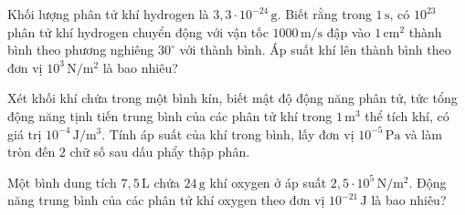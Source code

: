 \begin{ex}
Khối lượng phân tử khí hydrogen là $3,3\cdot 10^{-24}\,\mathrm{g}$. Biết rằng trong $1\,\mathrm{s}$, có $10^{23}$ phân tử khí hydrogen chuyển động với vận tốc $1000\,\mathrm{m/s}$ đập vào $1\,\mathrm{cm^2}$ thành bình theo phương nghiêng $30^\circ$ với thành bình. Áp suất khí lên thành bình theo đơn vị $10^3\,\mathrm{N/m^2}$ là bao nhiêu?
\end{ex}

\begin{ex}
Xét khối khí chứa trong một bình kín, biết mật độ động năng phân tử, tức tổng động năng tịnh tiến trung bình của các phân tử khí trong $1\,\mathrm{m^3}$ thể tích khí, có giá trị $10^{-4}\,\mathrm{J/m^3}$. Tính áp suất của khí trong bình, lấy đơn vị $10^{-5}\,\mathrm{Pa}$ và làm tròn đến $2$ chữ số sau dấu phẩy thập phân.
\end{ex}

\begin{ex}
Một bình dung tích $7,5\,\mathrm{L}$ chứa $24\,\mathrm{g}$ khí oxygen ở áp suất $2,5\cdot 10^5\,\mathrm{N/m^2}$. Động năng trung bình của các phân tử khí oxygen theo đơn vị $10^{-21}\,\mathrm{J}$ là bao nhiêu?
\end{ex}

